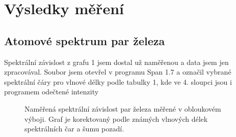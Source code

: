 \documentclass[a4paper,11pt]{article}
\begin{document}
\newpage

\section{Výsledky měření}

\subsection{Atomové spektrum par železa}

Spektrální závislost z grafu 1 jsem dostal už naměřenou a data jsem jen zpracovával. Soubor jsem otevřel v programu Span 1.7 a označil vybrané spektrální čáry pro vlnové délky podle tabulky 1, kde ve 4. sloupci jsou i programem odečtené intenzity

\begin{figure}[htpb]
    \centering
    
    \vspace{40pt}
    \captionsetup{type=graph}
    \caption{Naměřená spektrální závislost par železa měřené v obloukovém výboji. Graf je korektovaný podle známých vlnových délek spektrálních čar a šumu pozadí.}
\end{figure}

\vspace{-20pt}
\end{document}
